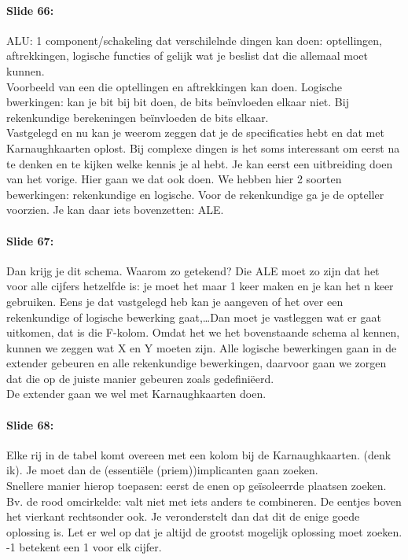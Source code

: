 \documentclass[10pt,a4paper]{book}
\begin{document}
\paragraph{Slide 66:} ALU: 1 component/schakeling dat verschilelnde dingen kan doen: optellingen, aftrekkingen, logische functies of gelijk wat je beslist dat die allemaal moet kunnen.\\
Voorbeeld van een die optellingen en aftrekkingen kan doen. Logische bwerkingen: kan je bit bij bit doen, de bits be\"invloeden elkaar niet. Bij rekenkundige berekeningen be\"invloeden de bits elkaar.\\
Vastgelegd en nu kan je weerom zeggen dat je de specificaties hebt en dat met Karnaughkaarten oplost. Bij complexe dingen is het soms interessant om eerst na te denken en te kijken welke kennis je al hebt. Je kan eerst een uitbreiding doen van het vorige. Hier gaan we dat ook doen. We hebben hier 2 soorten bewerkingen: rekenkundige en logische. Voor de rekenkundige ga je de opteller voorzien. Je kan daar iets bovenzetten: ALE.

\paragraph{Slide 67:} Dan krijg je dit schema. Waarom zo getekend? Die ALE moet zo zijn dat het voor alle cijfers hetzelfde is: je moet het maar 1 keer maken en je kan het n keer gebruiken. Eens je dat vastgelegd heb kan je aangeven of het over een rekenkundige of logische bewerking gaat,\ldots Dan moet je vastleggen wat er gaat uitkomen, dat is die F-kolom. Omdat het we het bovenstaande schema al kennen, kunnen we zeggen wat X en Y moeten zijn. Alle logische bewerkingen gaan in de extender gebeuren en alle rekenkundige bewerkingen, daarvoor gaan we zorgen dat die op de juiste manier gebeuren zoals gedefini\"eerd.\\
De extender gaan we wel met Karnaughkaarten doen.

\paragraph{Slide 68:} Elke rij in de tabel komt overeen met een kolom bij de Karnaughkaarten. (denk ik). Je moet dan de (essenti\"ele (priem))implicanten gaan zoeken.\\
Snellere manier hierop toepasen: eerst de enen op ge\"isoleerrde plaatsen zoeken. Bv. de rood omcirkelde: valt niet met iets anders te combineren. De eentjes boven het vierkant rechtsonder ook. Je veronderstelt dan dat dit de enige goede oplossing is. Let er wel op dat je altijd de grootst mogelijk oplossing moet zoeken. -1 betekent een 1 voor elk cijfer.
\end{document}
